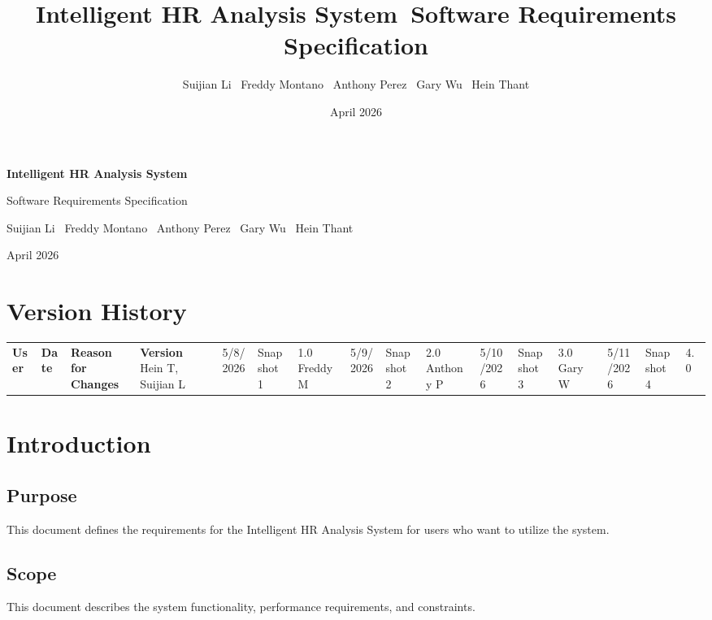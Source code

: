 \documentclass[12pt]{article}
\title{\textbf{Intelligent HR Analysis System}\
\large Software Requirements Specification}
\author{Suijian Li \ Freddy Montano \ Anthony Perez \ Gary Wu \ Hein Thant}
\date{April 2026}
\begin{document}
\begin{titlepage}
\centering
\vspace*{2cm}

{\LARGE \textbf{Intelligent HR Analysis System} \par}
\vspace{1cm}

{\Large Software Requirements Specification \par}
\vspace{2cm}

{\large
Suijian Li \
Freddy Montano \
Anthony Perez \
Gary Wu \
Hein Thant
\par}

\vfill

{\large April 2026 \par}

\end{titlepage}

\newpage
\tableofcontents
\newpage

\section*{Version History}

\begin{longtable}{|l|l|l|l|}
\hline
\textbf{User} & \textbf{Date} & \textbf{Reason for Changes} & \textbf{Version} \
\hline
Hein T, Suijian L & 5/8/2026 & Snapshot 1 & 1.0 \
\hline
Freddy M & 5/9/2026 & Snapshot 2 & 2.0 \
\hline
Anthony P & 5/10/2026 & Snapshot 3 & 3.0 \
\hline
Gary W & 5/11/2026 & Snapshot 4 & 4.0 \
\hline
\end{longtable}

\newpage

\section{Introduction}

\subsection{Purpose}
This document defines the requirements for the Intelligent HR Analysis System for users who want to utilize the system.

\subsection{Scope}
This document describes the system functionality, performance requirements, and constraints.
\end{document}
